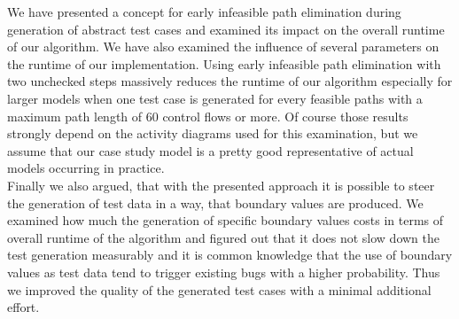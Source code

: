 We have presented a concept for early infeasible path elimination during generation of abstract test cases and examined its impact on the overall runtime of our algorithm. We have also examined the influence of several parameters on the runtime of our implementation. Using early infeasible path elimination with two unchecked steps massively reduces the runtime of our algorithm especially for larger models when one test case is generated for every feasible paths with a maximum path length of 60 control flows or more. Of course those results strongly depend on the activity diagrams used for this examination, but we assume that our case study model is a pretty good representative of actual models occurring in practice.\\
Finally we also argued, that with the presented approach it is possible to steer the generation of test data in a way, that boundary values are produced. We examined how much the generation of specific boundary values costs in terms of overall runtime of the algorithm and figured out that it does not slow down the test generation measurably and it is common knowledge that the use of boundary values as test data tend to trigger existing bugs with a higher probability. Thus we improved the quality of the generated test cases with a minimal additional effort.

